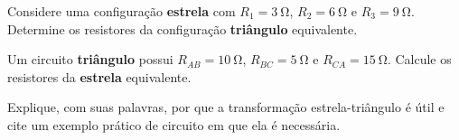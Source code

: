 \blocofixacao
\begin{questao}[1]{}

Considere uma configuração \textbf{estrela} com $R_1=\SI{3}{\ohm}$,
$R_2=\SI{6}{\ohm}$ e $R_3=\SI{9}{\ohm}$. Determine os resistores da configuração
\textbf{triângulo} equivalente.


\end{questao}
\begin{questao}[1]{}

Um circuito \textbf{triângulo} possui $R_{AB}=\SI{10}{\ohm}$,
$R_{BC}=\SI{5}{\ohm}$ e $R_{CA}=\SI{15}{\ohm}$. Calcule os resistores da
\textbf{estrela} equivalente.


\end{questao}
\begin{questao}[1]{}

Explique, com suas palavras, por que a transformação estrela-triângulo é útil e
cite um exemplo prático de circuito em que ela é necessária.


\end{questao}


